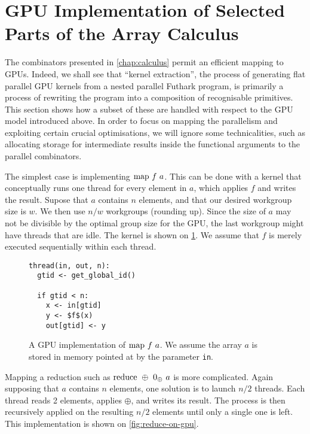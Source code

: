 \section{GPU Implementation of Selected Parts of the Array Calculus}
\label{sec:calculus-implementation}

The combinators presented in \cref{chap:calculus} permit an efficient
mapping to GPUs.  Indeed, we shall see that ``kernel extraction'', the
process of generating flat parallel GPU kernels from a nested parallel
Futhark program, is primarily a process of rewriting the program into
a composition of recognisable primitives.  This section shows how a
subset of these are handled with respect to the GPU model introduced
above.  In order to focus on mapping the parallelism and exploiting
certain crucial optimisations, we will ignore some technicalities,
such as allocating storage for intermediate results inside the
functional arguments to the parallel combinators.

The simplest case is implementing $\mathrm{map}~f~a$.  This can be done with
a kernel that conceptually runs one thread for every element in $a$,
which applies $f$ and writes the result.  Supose that $a$ contains $n$
elements, and that our desired workgroup size is $w$.  We then use
$n/w$ workgroups (rounding up).  Since the size of $a$ may not be
divisible by the optimal group size for the GPU, the last workgroup
might have threads that are idle.  The kernel is shown on
\cref{fig:map-on-gpu}.  We assume that $f$ is merely executed
sequentially within each thread.

\begin{figure}

\begin{lstlisting}[language={},mathescape]
thread(in, out, n):
  gtid <- get_global_id()

  if gtid < n:
    x <- in[gtid]
    y <- $f$(x)
    out[gtid] <- y
\end{lstlisting}

  \caption{A GPU implementation of $\mathrm{map}~f~a$.  We assume the array
    $a$ is stored in memory pointed at by the parameter \texttt{in}.}
  \label{fig:map-on-gpu}
\end{figure}

Mapping a reduction such as $\mathrm{reduce}~\oplus~0_{\oplus}~a$ is more
complicated.  Again supposing that $a$ contains $n$ elements, one
solution is to launch $n/2$ threads.  Each thread reads 2 elements,
applies $\oplus$, and writes its result.  The process is then
recursively applied on the resulting $n/2$ elements until only a
single one is left.  This implementation is shown on
\cref{fig:reduce-on-gpu}.

